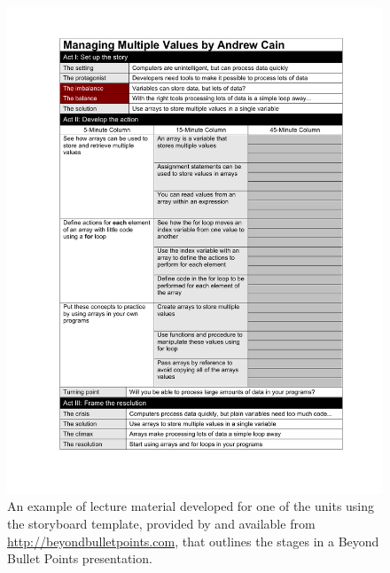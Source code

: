 \begin{figure}[htbp]
	\centering
	\includegraphics[width=\textwidth]{bbp}
	\caption{An example of lecture material developed for one of the units using the storyboard template, provided by \citet{Atkinson:2007} and available from \url{http://beyondbulletpoints.com}, that outlines the stages in a Beyond Bullet Points presentation.}
	\label{fig:bbp}
\end{figure}

